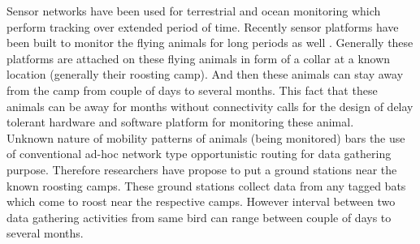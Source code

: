 \documentclass[conference]{IEEEtran}
\begin{document}
Sensor networks have been used for terrestrial \cite{robo-mote} and ocean monitoring \cite{Vasilescu05krill:an} which perform tracking over extended period of time. Recently sensor platforms have been built to monitor the flying animals for long periods as well \cite{Anthony:2012:STC:2185677.2185747} \cite{raja-ipsn}. Generally these platforms are attached on these flying animals in form of a collar at a known location (generally their roosting camp). And then these animals can stay away from the camp from couple of days to several months. This fact that these animals can be away for months without connectivity calls for the design of delay tolerant hardware and software platform for monitoring these animal. \\
Unknown nature of mobility patterns of animals (being monitored) bars the use of conventional ad-hoc network type opportunistic routing for data gathering purpose. Therefore researchers have propose to put a ground stations near the known roosting camps\cite{raja-ipsn}. These ground stations collect data from any tagged bats which come to roost near the respective camps. However interval between two data gathering activities from same bird can range between couple of days to several months. \\ %
\end{document}

